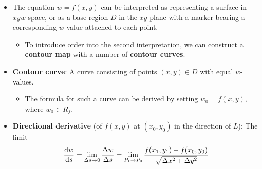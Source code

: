 \documentclass[../main.tex]{subfiles}
\begin{document}
\begin{itemize}
    \item The equation $w=f(x,y)$ can be interpreted as representing a surface in $xyw$-space, or as a base region $D$ in the $xy$-plane with a marker bearing a corresponding $w$-value attached to each point.
    \begin{itemize}
        \item To introduce order into the second interpretation, we can construct a \textbf{contour map} with a number of \textbf{contour curves}.
    \end{itemize}
    \item \textbf{Contour curve}: A curve consisting of points $(x,y)\in D$ with equal $w$-values.
    \begin{itemize}
        \item The formula for such a curve can be derived by setting $w_0=f(x,y)$, where $w_0\in R_f$.
    \end{itemize}
    \item \textbf{Directional derivative} (of $f(x,y)$ at $(x_0,y_0)$ in the direction of $L$): The limit
    \begin{equation*}
        \dv{w}{s} = \lim_{\Delta s\to 0}\frac{\Delta w}{\Delta s} = \lim_{P_1\to P_0}\frac{f(x_1,y_1)-f(x_0,y_0)}{\sqrt{\Delta x^2+\Delta y^2}}
    \end{equation*}
    \begin{figure}[h!]
        \centering
\end{figure}
\end{itemize}
\end{document}
